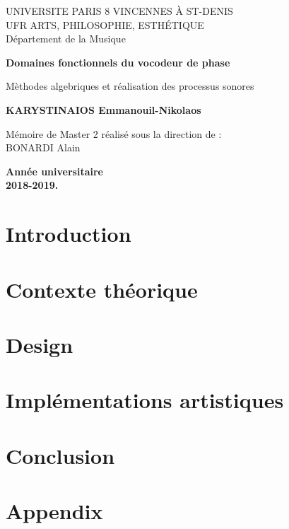 \documentclass[a4paper,12pt,twoside]{report}
\author{KARYSTINAIOS Emmanouil Nikolaos}
\begin{document}
% 
\begin{titlepage}
    \begin{center}
        UNIVERSITE PARIS 8 VINCENNES À ST-DENIS \\
        UFR ARTS, PHILOSOPHIE, ESTHÉTIQUE \\
        Département de la Musique
        \vspace*{7cm}
        
        \textbf{\Large{Domaines fonctionnels du vocodeur de phase}}
        
        \vspace{0.5cm}
        Mèthodes algebriques et réalisation des processus sonores
        
        \vspace{3cm}
        
        \textbf{KARYSTINAIOS Emmanouil-Nikolaos}
        
        \vspace{4cm}    

        Mémoire de Master 2 réalisé sous la direction de : \\
        BONARDI Alain 

        \vspace{3cm}
        
        \textbf{Année universitaire \\ 2018-2019.}
        
        
        
        
        
    \end{center}
\end{titlepage}
\preface


\body
\chapter{Introduction}

\chapter{Contexte théorique}

\chapter{Design}

\chapter{Implémentations artistiques}

\chapter{Conclusion}

\appendix
\chapter{Appendix}

\lstlistoflistings 




\end{document}
